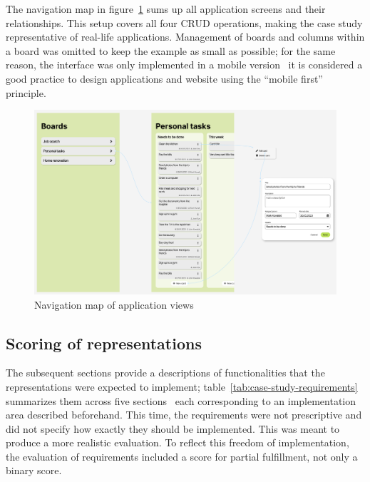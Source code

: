 The navigation map in figure~\ref{fig:3-4-navigation-map} sums up all application screens and their relationships.
This setup covers all four CRUD operations, making the case study representative of real-life applications.
Management of boards and columns within a board was omitted to keep the example as small as possible;
for the same reason, the interface was only implemented in a mobile version \textendash\ it is considered a good practice to design applications and website using the \enquote{mobile first} principle.

\begin{figure}
    \centering
    \includegraphics[width=\textwidth]{3-research-methodology/nav-map}
    \caption{Navigation map of application views}
    \label{fig:3-4-navigation-map}
\end{figure}

\subsection{Scoring of representations}\label{subsec:scoring-of-representations2}

The subsequent sections provide a descriptions of functionalities that the representations were expected to implement;
table~\ref{tab:case-study-requirements} summarizes them across five sections \textendash\ each corresponding to an implementation area described beforehand.
This time, the requirements were not prescriptive and did not specify how exactly they should be implemented.
This was meant to produce a more realistic evaluation.
To reflect this freedom of implementation, the evaluation of requirements included a score for partial fulfillment, not only a binary score.

